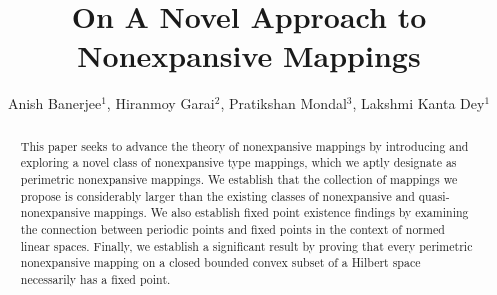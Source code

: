 \documentclass[11pt,reqno]{amsart}
\theoremstyle{definition}
\newtheorem{Open Prob}[theorem]{Open Problem}
\theoremstyle{remark}
\numberwithin{equation}{section}
\begin{document}
\title[On A Novel Approach to Nonexpansive Mappings]{ On A Novel Approach to Nonexpansive Mappings }


\author[A.\ Banerjee, H.\ Garai, P.\ Mondal, L.K.\ Dey]
{Anish Banerjee$^{1}$, Hiranmoy Garai$^{2}$, Pratikshan Mondal$^{3}$, Lakshmi Kanta Dey$^{1}$}

\address{{$^{1}$}   Anish Banerjee,
                    Department of Mathematics,
                    National Institute of Technology
                    Durgapur, West Bengal,  India}
\address{{$^{2}$}   Hiranmoy Garai,
                    Department of Mathematics,
                    Government General Degree College Ranibandh, 
                    Bankura, West Bengal, India}
\address{{$^{3}$}   Pratikshan Mondal,
                    Department of Mathematics,
                    A.B.N. Seal College, 
                    Cooch Behar, West Bengal, India}
\address{{$^{1}$}   Lakshmi Kanta Dey,
                    Department of Mathematics,
                    National Institute of Technology
                    Durgapur, West Bengal, India}
                
                    


\begin{abstract}
This paper seeks to advance the theory of nonexpansive mappings by introducing and exploring a novel class of nonexpansive type mappings, which we aptly designate as perimetric nonexpansive mappings. We establish that the collection of mappings we propose is considerably larger than the existing classes of nonexpansive and quasi-nonexpansive mappings. We also establish fixed point existence findings by examining the connection between periodic points and fixed points in the context of normed linear spaces. Finally, we establish a significant result by proving that every perimetric nonexpansive mapping on a closed bounded convex subset of a Hilbert space necessarily has a fixed point.
\end{abstract}


\maketitle
\setcounter{page}{1}
\end{document}
